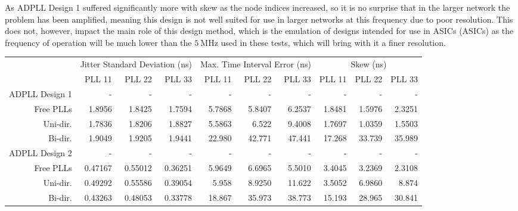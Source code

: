 As \ac{ADPLL} Design 1 suffered significantly more with skew as the node indices increased, so it is no surprise that in the larger network the problem has been amplified, meaning this design is not well suited for use in larger networks at this frequency due to poor resolution. This does not, however, impact the main role of this design method, which is the emulation of designs intended for use in \aclp{ASIC} (\acsp{ASIC}) as the frequency of operation will be much lower than the $5~\si{\mega\hertz}$ used in these tests, which will bring with it a finer resolution.
\begin{table}[!ht]
    \begin{center}
        \begin{footnotesize}
            \setlength{\tabcolsep}{.9\tabcolsep}
            \begin{tabular}{ll|r|r|r|r|r|r|r|r|r|}           
                \cline{3-11}
                && \multicolumn{3}{c|}{Jitter Standard Deviation (ns)} & \multicolumn{3}{c|}{Max. Time Interval Error (ns)} & \multicolumn{3}{c|}{Skew (ns)} \T\\
                \cline{3-11} 
                &&PLL 11&PLL 22&PLL 33    &PLL 11&PLL 22&PLL 33    &PLL 11&PLL 22&PLL 33 \T\\
                \hline
                \multicolumn{2}{|l|}{\ac{ADPLL} Design 1}&-&-&-&-&-&-&-&-&-\T\\
                \multicolumn{2}{|r|}{Free PLLs} &1.8956  &1.8425  &1.7594     &5.7868 &5.8407 &6.2537    &1.8481 &1.5976 &2.3251 \T\\
                \multicolumn{2}{|r|}{Uni-dir.}  &1.7836  &1.8206  &1.8827     &5.5863 &6.522  &9.4008    &1.7697 &1.0359 &1.5503 \T\\
                \multicolumn{2}{|r|}{Bi-dir.}   &1.9049  &1.9205  &1.9441     &22.980 &42.771 &47.441    &17.268 &33.739 &35.989 \T\\
                \hline
                \multicolumn{2}{|l|}{\ac{ADPLL} Design 2}&-&-&-&-&-&-&-&-&-\T\\
                \multicolumn{2}{|r|}{Free PLLs} &0.47167 &0.55012 &0.36251    &5.9649 &6.6965 &5.5010    &3.4045&3.2369&2.3108   \T\\
                \multicolumn{2}{|r|}{Uni-dir.}  &0.49292 &0.55586 &0.39054    &5.958  &8.9250 &11.622    &3.5052&6.9860&8.874    \T\\
                \multicolumn{2}{|r|}{Bi-dir.}   &0.43263 &0.48053 &0.33778    &18.867 &35.973 &38.773    &15.193&28.965&30.841   \T\\

\end{tabular}
\end{footnotesize}
\end{center}
\end{table}
